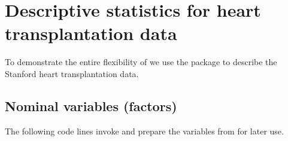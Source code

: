 \documentclass[nojss]{jss}
\begin{document}
\section{Descriptive statistics for heart transplantation data} \label{sec: heart}
To demonstrate the entire flexibility of  we use the package to describe the Stanford heart
transplantation data.

\subsection{Nominal variables (factors)}
The following code lines invoke  and prepare the variables from  for later use. 
\end{document}
